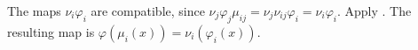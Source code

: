 The maps $\nu_i\varphi_i$ are compatible, since $\nu_j\varphi_j\mu_{ij}=\nu_j\nu_{ij}\varphi_i=\nu_i\varphi_i$. Apply . The resulting map is $\varphi(\mu_i(x))=\nu_i(\varphi_i(x))$.
